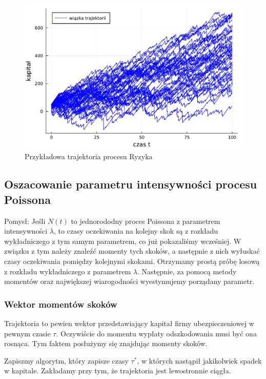 \documentclass{article}
\theoremstyle{break}
\numberwithin{equation}{subsection}
\numberwithin{figure}{section}
\begin{document}
\begin{figure}[H]
	\center
	\includegraphics[scale=0.35]{wizualizacja_trajektorii.pdf}
	\caption{Przykładowa trajektoria procesu Ryzyka}
	\label{fig: wizualizacja}
\end{figure}

\subsection{Oszacowanie parametru intensywności procesu Poissona}

Pomysł: Jeśli $N(t)$ to jednorododny proces Poissona z parametrem intensywności $\lambda$, to czasy oczekiwania na kolejny skok są z rozkładu wykładniczego z tym samym parametrem, co już pokazaliśmy wcześniej. W związku z tym należy znaleźć momenty tych skoków, a następnie z nich wyłuskać czasy oczekiwania pomiędzy kolejnymi skokami. Otrzymamy prostą próbę losową z rozkładu wykładniczego z parametrem $\lambda$.
Następnie, za pomocą metody momentów oraz największej wiarogodności wyestymujemy porządany parametr.

\subsubsection*{Wektor momentów skoków}

Trajektoria to pewien wektor przedstawiający kapitał firmy ubezpieczeniowej w pewnym czasie $\tau$. Oczywiście do momentu wypłaty odszkodowania musi być ona rosnąca. Tym faktem posłużymy się znajdując momenty skoków.

Zapiszmy algorytm, który zapisze czasy $\tau^*$, w których nastąpił jakikolwiek spadek w kapitale. Zakładamy przy tym, że trajektoria jest lewostronnie ciągła.
\end{document}
